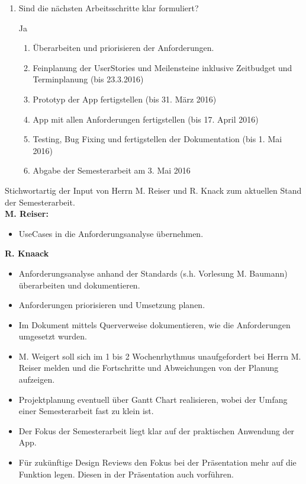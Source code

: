 \begin{enumerate}
	\item Sind die nächsten Arbeitsschritte klar formuliert?\\
	{\color{DarkSlateBlue}Ja
		\begin{enumerate}
			\item Überarbeiten und priorisieren der Anforderungen.
			\item Feinplanung der UserStories und Meilensteine inklusive Zeitbudget und Terminplanung (bis 23.3.2016)
			\item Prototyp der App fertigstellen (bis 31. März 2016)
			\item App mit allen Anforderungen fertigstellen (bis 17. April 2016)
			\item Testing, Bug Fixing und fertigstellen der Dokumentation (bis 1. Mai 2016)
			\item Abgabe der Semesterarbeit am 3. Mai 2016
		\end{enumerate}}
\end{enumerate}

\newpage

Stichwortartig der Input von Herrn M. Reiser und R. Knack zum aktuellen Stand der Semesterarbeit.\\

\textbf{M. Reiser:}
\begin{itemize}
	\item UseCases in die Anforderungsanalyse übernehmen.
\end{itemize}

\textbf{R. Knaack}
\begin{itemize}
	\item Anforderungsanalyse anhand der Standards (s.h. Vorlesung M. Baumann) überarbeiten und dokumentieren.
	\item Anforderungen priorisieren und Umsetzung planen.
	\item Im Dokument mittels Querverweise dokumentieren, wie die Anforderungen umgesetzt wurden.
	\item M. Weigert soll sich im 1 bis 2 Wochenrhythmus unaufgefordert bei Herrn M. Reiser melden und die Fortschritte und Abweichungen von der Planung aufzeigen.
	\item Projektplanung eventuell über Gantt Chart realisieren, wobei der Umfang einer Semesterarbeit fast zu klein ist.
	\item Der Fokus der Semesterarbeit liegt klar auf der praktischen Anwendung der App.
	\item Für zukünftige Design Reviews den Fokus bei der Präsentation mehr auf die Funktion legen. Diesen in der Präsentation auch vorführen.  
\end{itemize}